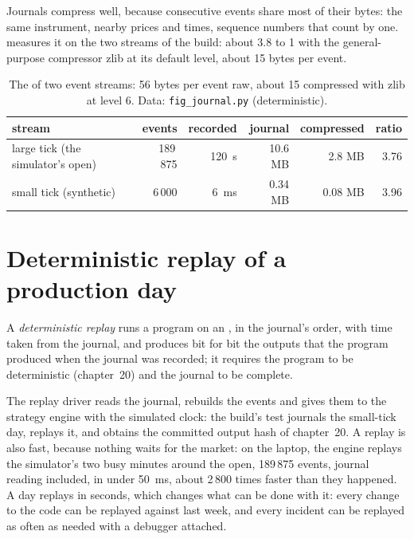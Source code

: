 Journals compress well, because consecutive events share most of their bytes: the same instrument, nearby prices and times,
sequence numbers that count by one.  measures it on the two streams of the
build: about 3.8 to 1 with the general-purpose compressor zlib at its default level, about 15 bytes per event.

\begin{table}[ht]
\centering\small
\begin{tabular}{lrrrrr}
\toprule
stream & events & recorded & journal & compressed & ratio \\
\midrule
large tick (the simulator's open) & 189\,875 & \qty{120}{\second} & 10.6 MB & 2.8 MB & 3.76 \\
small tick (synthetic) & 6\,000 & \qty{6}{\milli\second} & 0.34 MB & 0.08 MB & 3.96 \\
\bottomrule
\end{tabular}
\caption{The  of two event streams: 56 bytes per event raw, about 15 compressed with zlib at level 6. Data:
\texttt{fig\_journal.py} (deterministic).}\label{tab:ll:logging-capture-and-replay:journal}
\end{table}

\section{Deterministic replay of a production day}

\begin{definition}\label{def:ll:logging-capture-and-replay:replay}
A \emph{deterministic replay} runs a program on an , in the journal's order, with time
taken from the journal, and produces bit for bit the outputs that the program produced when the journal was recorded; it
requires the program to be deterministic (chapter~20) and the journal to be complete.
\end{definition}

The replay driver reads the journal, rebuilds the events and gives them to the strategy engine with the simulated clock: the
build's test journals the small-tick day, replays it, and obtains the committed output hash of chapter~20. A replay is also
fast, because nothing waits for the market: on the laptop, the engine replays the simulator's two busy minutes around the open,
189\,875 events, journal reading included, in under \qty{50}{\milli\second}, about 2\,800 times faster than they happened. A day
replays in seconds, which changes what can be done with it: every change to the code can be replayed against last week, and
every incident can be replayed as often as needed with a debugger attached.

